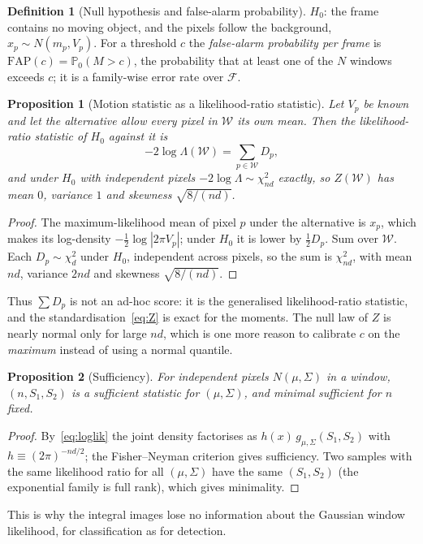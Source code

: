 \documentclass[11pt,a4paper]{article}
\newtheorem{proposition}{Proposition}
\theoremstyle{definition}
\newtheorem{definition}{Definition}
\newcommand{\Pp}{\mathbb{P}}
\begin{document}
\begin{definition}[Null hypothesis and false-alarm probability]
$H_0$: the frame contains no moving object, and the pixels follow the background, $x_p\sim N(m_p,V_p)$.
For a threshold $c$ the \emph{false-alarm probability per frame} is $\mathrm{FAP}(c)=\Pp_0(M>c)$, the probability that at least one of the $N$ windows exceeds $c$; it is a family-wise error rate over $\mathcal F$.
\end{definition}

\begin{proposition}[Motion statistic as a likelihood-ratio statistic]\label{prop:glr}
Let $V_p$ be known and let the alternative allow every pixel in $\mathcal W$ its own mean. Then the likelihood-ratio statistic of $H_0$ against it is
\[
-2\log\Lambda(\mathcal W)=\sum_{p\in\mathcal W}D_p ,
\]
and under $H_0$ with independent pixels $-2\log\Lambda\sim\chi^2_{nd}$ exactly, so $Z(\mathcal W)$ has mean $0$, variance $1$ and skewness $\sqrt{8/(nd)}$.
\end{proposition}
\begin{proof}
The maximum-likelihood mean of pixel $p$ under the alternative is $x_p$, which makes its log-density $-\tfrac12\log|2\pi V_p|$; under $H_0$ it is lower by $\tfrac12D_p$. Sum over $\mathcal W$. Each $D_p\sim\chi^2_d$ under $H_0$, independent across pixels, so the sum is $\chi^2_{nd}$, with mean $nd$, variance $2nd$ and skewness $\sqrt{8/(nd)}$.
\end{proof}
Thus $\sum D_p$ is not an ad-hoc score: it is the generalised likelihood-ratio statistic, and the standardisation~\eqref{eq:Z} is exact for the moments. The null law of $Z$ is nearly normal only for large $nd$, which is one more reason to calibrate $c$ on the \emph{maximum} instead of using a normal quantile.

\begin{proposition}[Sufficiency]\label{prop:suff}
For independent pixels $N(\mu,\Sigma)$ in a window, $(n,S_1,S_2)$ is a sufficient statistic for $(\mu,\Sigma)$, and minimal sufficient for $n$ fixed.
\end{proposition}
\begin{proof}
By~\eqref{eq:loglik} the joint density factorises as $h(x)\,g_{\mu,\Sigma}(S_1,S_2)$ with $h\equiv(2\pi)^{-nd/2}$; the Fisher--Neyman criterion gives sufficiency. Two samples with the same likelihood ratio for all $(\mu,\Sigma)$ have the same $(S_1,S_2)$ (the exponential family is full rank), which gives minimality.
\end{proof}
This is why the integral images lose no information about the Gaussian window likelihood, for classification as for detection.
\end{document}
